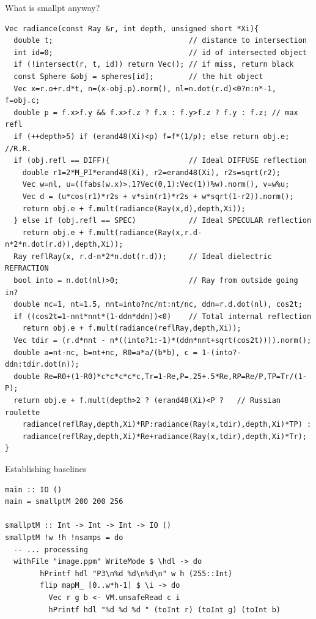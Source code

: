 \documentclass[8pt]{beamer}
\newcommand{\raw}[1]{\texttt{#1}}
\begin{document}
\begin{frame}[fragile]{What is smallpt anyway?}
\footnotesize
\begin{verbatim}
Vec radiance(const Ray &r, int depth, unsigned short *Xi){ 
  double t;                               // distance to intersection 
  int id=0;                               // id of intersected object 
  if (!intersect(r, t, id)) return Vec(); // if miss, return black 
  const Sphere &obj = spheres[id];        // the hit object 
  Vec x=r.o+r.d*t, n=(x-obj.p).norm(), nl=n.dot(r.d)<0?n:n*-1, f=obj.c; 
  double p = f.x>f.y && f.x>f.z ? f.x : f.y>f.z ? f.y : f.z; // max refl 
  if (++depth>5) if (erand48(Xi)<p) f=f*(1/p); else return obj.e; //R.R. 
  if (obj.refl == DIFF){                  // Ideal DIFFUSE reflection 
    double r1=2*M_PI*erand48(Xi), r2=erand48(Xi), r2s=sqrt(r2); 
    Vec w=nl, u=((fabs(w.x)>.1?Vec(0,1):Vec(1))%w).norm(), v=w%u; 
    Vec d = (u*cos(r1)*r2s + v*sin(r1)*r2s + w*sqrt(1-r2)).norm(); 
    return obj.e + f.mult(radiance(Ray(x,d),depth,Xi)); 
  } else if (obj.refl == SPEC)            // Ideal SPECULAR reflection 
    return obj.e + f.mult(radiance(Ray(x,r.d-n*2*n.dot(r.d)),depth,Xi)); 
  Ray reflRay(x, r.d-n*2*n.dot(r.d));     // Ideal dielectric REFRACTION 
  bool into = n.dot(nl)>0;                // Ray from outside going in? 
  double nc=1, nt=1.5, nnt=into?nc/nt:nt/nc, ddn=r.d.dot(nl), cos2t; 
  if ((cos2t=1-nnt*nnt*(1-ddn*ddn))<0)    // Total internal reflection 
    return obj.e + f.mult(radiance(reflRay,depth,Xi)); 
  Vec tdir = (r.d*nnt - n*((into?1:-1)*(ddn*nnt+sqrt(cos2t)))).norm(); 
  double a=nt-nc, b=nt+nc, R0=a*a/(b*b), c = 1-(into?-ddn:tdir.dot(n)); 
  double Re=R0+(1-R0)*c*c*c*c*c,Tr=1-Re,P=.25+.5*Re,RP=Re/P,TP=Tr/(1-P); 
  return obj.e + f.mult(depth>2 ? (erand48(Xi)<P ?   // Russian roulette 
    radiance(reflRay,depth,Xi)*RP:radiance(Ray(x,tdir),depth,Xi)*TP) : 
    radiance(reflRay,depth,Xi)*Re+radiance(Ray(x,tdir),depth,Xi)*Tr); 
} 
\end{verbatim}
\end{frame}

\begin{frame}[fragile]{Establishing baselines}
\begin{verbatim}
main :: IO ()
main = smallptM 200 200 256

smallptM :: Int -> Int -> Int -> IO ()
smallptM !w !h !nsamps = do
  -- ... processing
  withFile "image.ppm" WriteMode $ \hdl -> do
        hPrintf hdl "P3\n%d %d\n%d\n" w h (255::Int)
        flip mapM_ [0..w*h-1] $ \i -> do
          Vec r g b <- VM.unsafeRead c i
          hPrintf hdl "%d %d %d " (toInt r) (toInt g) (toInt b)
\end{verbatim}


\end{frame}
\end{document}
